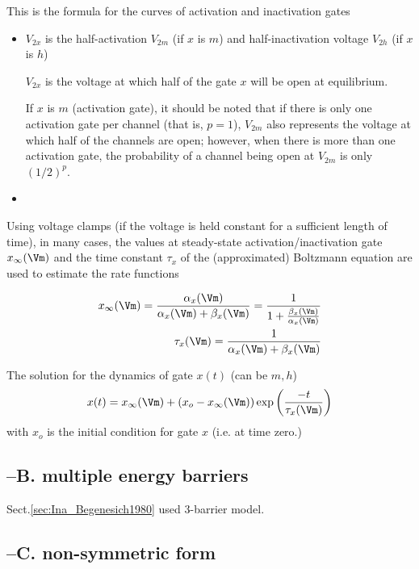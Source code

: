 This is the formula for the curves of activation and inactivation gates
\begin{itemize}
  \item $V_{2x}$ is the half-activation $V_{2m}$ (if $x$ is $m$) and
  half-inactivation voltage $V_{2h}$ (if $x$ is $h$)

$V_{2x}$ is the voltage at which half of the gate $x$ will be open at
equilibrium.

If $x$ is $m$ (activation gate), it should be noted that if there is only one
activation gate per channel (that is, $p=1$), $V_{2m}$ also represents the
voltage at which half of the channels are open; however, when there is more than
one activation gate, the probability of a channel being open at $V_{2m}$ is only
$(1/2)^p$.

  \item
\end{itemize}


Using voltage clamps (if the voltage is held constant for a sufficient length
of time), in many cases, the values at steady-state activation/inactivation gate
$x_\infty(\Vm)$ and the time constant $\tau_x$ of the (approximated) Boltzmann
equation are used to estimate the rate functions

\begin{equation}
\begin{split}
x_\infty (\Vm) = \frac{\alpha_x(\Vm)}{\alpha_x(\Vm) + \beta_x(\Vm)} =
\frac{1}{1 + \frac{\beta_x(\Vm)}{\alpha_x(\Vm)}} \\
\tau_x(\Vm) = \frac{1}{\alpha_x (\Vm) + \beta_x(\Vm)}
\end{split}
\end{equation}

The solution for the dynamics of gate $x(t)$ (can be $m,h$)
\begin{equation}
x(t) = x_\infty(\Vm) + (x_o - x_\infty(\Vm)) \exp\left(
\frac{-t}{\tau_x(\Vm)}\right)
\end{equation}
with $x_o$ is the initial condition for gate $x$ (i.e. at time zero.)



\subsection{--B. multiple energy barriers}

Sect.\ref{sec:Ina_Begenesich1980} used 3-barrier model.

\subsection{--C. non-symmetric form}

